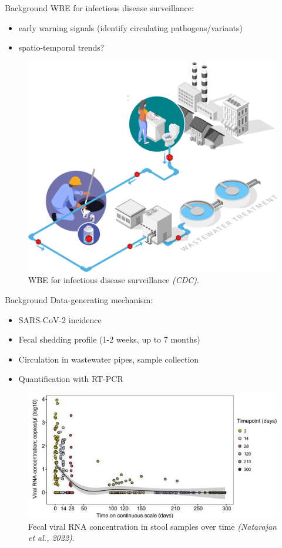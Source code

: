\documentclass[
  ignorenonframetext,
]{beamer}
\begin{document}
\begin{frame}{Background}
\protect\hypertarget{background-1}{}
WBE for infectious disease surveillance:

\begin{itemize}
\item
  \alert{early warning signals} (identify circulating
  pathogens/variants)
\item
  \alert{spatio-temporal trends?}
\end{itemize}

\begin{figure}
\centering
\includegraphics[width=.5\linewidth]{figures/wastewater-surveillance-illustration-cdc}
\caption{WBE for infectious disease surveillance \textit{(CDC)}.}
\end{figure}
\end{frame}

\begin{frame}{Background}
\protect\hypertarget{background-2}{}
Data-generating mechanism:

\begin{itemize}
\item
  SARS-CoV-2 incidence
\item
  \alert{Fecal shedding profile} (1-2 weeks, up to 7 months)
\item
  Circulation in wastewater pipes, sample collection
\item
  Quantification with RT-PCR
\end{itemize}

\begin{figure}
\centering
\includegraphics[width=.5\linewidth]{figures/shedding}
\caption{Fecal viral RNA concentration in stool samples over time \textit{(Natarajan et al., 2022)}.}
\end{figure}
\end{frame}
\end{document}
